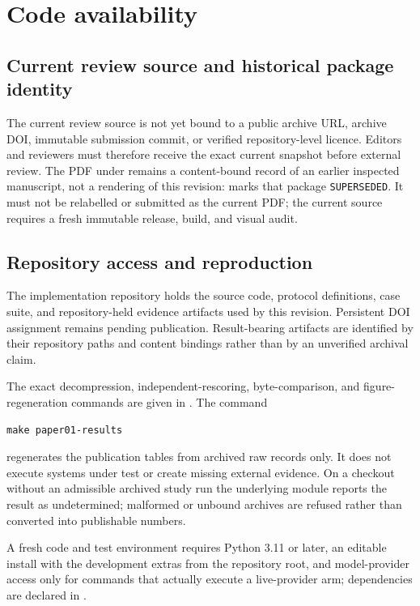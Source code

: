 \section{Code availability}

\subsection{Current review source and historical package identity}
The current review source is not yet bound to a public archive URL, archive
DOI, immutable submission commit, or verified repository-level licence. Editors
and reviewers must therefore receive the exact current snapshot before external
review. The PDF under  remains a content-bound record of
an earlier inspected manuscript, not a rendering of this revision:
 marks that package
\texttt{SUPERSEDED}. It must not be relabelled or submitted as the current PDF;
the current source requires a fresh immutable release, build, and visual audit.

\subsection{Repository access and reproduction}
The implementation repository holds the source code, protocol definitions, case
suite, and repository-held evidence artifacts used by this revision. Persistent
DOI assignment remains pending publication. Result-bearing artifacts are identified by their repository paths
and content bindings rather than by an unverified archival claim.

The exact decompression, independent-rescoring, byte-comparison, and
figure-regeneration commands are given in . The command
\begin{verbatim}
make paper01-results
\end{verbatim}
regenerates the publication tables from archived raw records only. It does not
execute systems under test or create missing external evidence. On a checkout
without an admissible archived study run the underlying module reports the
result as undetermined; malformed or unbound archives are refused rather than
converted into publishable numbers.

A fresh code and test environment requires Python 3.11 or later, an editable
install with the development extras from the repository root, and
model-provider access only for commands that actually execute a live-provider
arm; dependencies are declared in .

